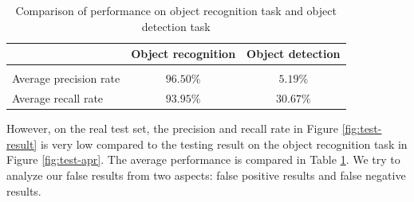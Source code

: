 \documentclass{article} %
\begin{document}
\begin{table}[htb]
\caption{Comparison of performance on object recognition task and object detection task}
\label{tab:comp}
\begin{center}
\begin{tabular}{lcc}
\multicolumn{1}{c}{} &\multicolumn{1}{c}{\bf Object recognition}  &\multicolumn{1}{c}{\bf Object detection}
\\ \hline \\
Average precision rate & $96.50\%$ & $5.19\%$ \\
Average recall rate    & $93.95\%$ & $30.67\%$ \\
\end{tabular}
\end{center}
\end{table}

However, on the real test set, the precision and recall rate in Figure \ref{fig:test-result} is very low compared to the testing result on the object recognition task in Figure \ref{fig:test-apr}. The average performance is compared in Table \ref{tab:comp}. We try to analyze our false results from two aspects: false positive results and false negative results.
\end{document}
